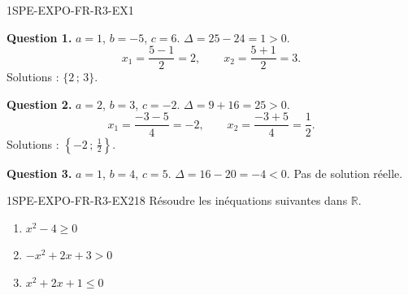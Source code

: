 
\begin{corrige}{1SPE-EXPO-FR-R3-EX1}


\textbf{Question 1.} $a = 1$, $b = -5$, $c = 6$.
$\Delta = 25 - 24 = 1 > 0$.
\[
x_1 = \frac{5 - 1}{2} = 2, \qquad x_2 = \frac{5 + 1}{2} = 3.
\]
Solutions : $\{2\,;\,3\}$.

\textbf{Question 2.} $a = 2$, $b = 3$, $c = -2$.
$\Delta = 9 + 16 = 25 > 0$.
\[
x_1 = \frac{-3 - 5}{4} = -2, \qquad x_2 = \frac{-3 + 5}{4} = \frac{1}{2}.
\]
Solutions : $\left\{-2\,;\,\frac{1}{2}\right\}$.

\textbf{Question 3.} $a = 1$, $b = 4$, $c = 5$.
$\Delta = 16 - 20 = -4 < 0$.
Pas de solution réelle.

\end{corrige}


\begin{exercice}{1SPE-EXPO-FR-R3-EX2}{1}{8}
Résoudre les inéquations suivantes dans $\mathbb{R}$.
\begin{enumerate}
  \item $x^2 - 4 \geqslant 0$
  \item $-x^2 + 2x + 3 > 0$
  \item $x^2 + 2x + 1 \leqslant 0$
\end{enumerate}
\end{exercice}



